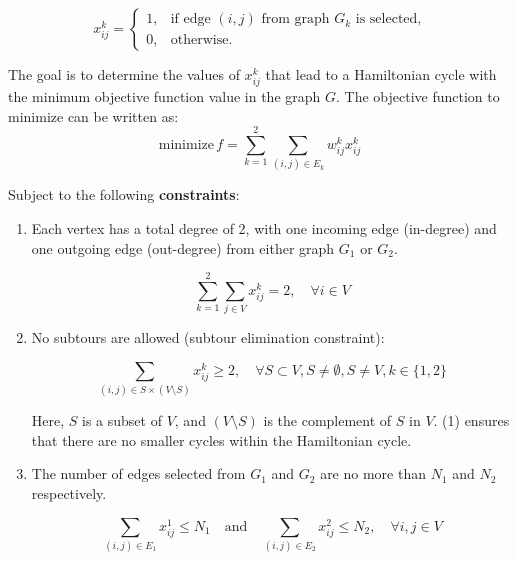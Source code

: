 \documentclass[11pt]{article}
\begin{document}
\begin{equation*}
x_{ij}^k =
\begin{cases}
1, & \text{if edge } (i, j) \text{ from graph } G_k \text{ is selected,} \\
0, & \text{otherwise.}
\end{cases}
\end{equation*}

The goal is to determine the values of $x_{ij}^k$ that lead to a Hamiltonian cycle with the minimum objective function value in the graph $G$.
 The objective function to minimize can be written as:
\begin{equation*}
  \text{minimize} \, f = \sum_{k=1}^{2} \sum_{(i,j) \in E_k} w_{ij}^k x_{ij}^k
\end{equation*}

Subject to the following \textbf{constraints}:

\begin{enumerate}
  \item Each vertex has a total degree of 2, with one incoming edge (in-degree) and one outgoing edge (out-degree) from either graph $G_1$ or $G_2$.

  \begin{equation*}
    \sum_{k=1}^{2} \sum_{j \in V} x_{ij}^k = 2, \quad \forall i \in V
  \end{equation*}
  \item No subtours are allowed (subtour elimination constraint):

  \begin{equation}
    \sum_{(i,j) \in S \times (V \setminus S)} x_{ij}^k \geq 2, \quad \forall S \subset V, S \neq \emptyset, S \neq V, k \in \{1, 2\}
  \end{equation}
  
  Here, $S$ is a subset of $V$, and $(V \setminus S)$ is the complement of $S$ in $V$. (1) ensures that there are no smaller cycles within the Hamiltonian cycle.
  \item The number of edges selected from $G_1$ and $G_2$ are no more than $N_1$ and $N_2$ respectively.

  \begin{equation*}
    \sum_{(i,j) \in E_1} x_{ij}^1 \leq N_1 \quad \text{and} \quad \sum_{(i,j) \in E_2} x_{ij}^2 \leq N_2,  \quad \forall i,j \in V
  \end{equation*}
\end{enumerate}
\end{document}
